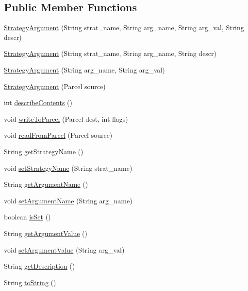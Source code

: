 \subsection*{Public Member Functions}
\begin{DoxyCompactItemize}
\item 
\hyperlink{classch_1_1zhaw_1_1ba10__bsha__1_1_1StrategyArgument_a66be298497fd2bf1afb35984d52360b8}{StrategyArgument} (String strat\_\-name, String arg\_\-name, String arg\_\-val, String descr)
\item 
\hyperlink{classch_1_1zhaw_1_1ba10__bsha__1_1_1StrategyArgument_a78121903280e3471780120ff923eb864}{StrategyArgument} (String strat\_\-name, String arg\_\-name, String descr)
\item 
\hyperlink{classch_1_1zhaw_1_1ba10__bsha__1_1_1StrategyArgument_a1fd5b2ee140e28571e04c21059377290}{StrategyArgument} (String arg\_\-name, String arg\_\-val)
\item 
\hyperlink{classch_1_1zhaw_1_1ba10__bsha__1_1_1StrategyArgument_a168a3cb11b9268aeeb2da1a0beca2e48}{StrategyArgument} (Parcel source)
\item 
int \hyperlink{classch_1_1zhaw_1_1ba10__bsha__1_1_1StrategyArgument_a9512363209aaf07138c49d9f5ad4e544}{describeContents} ()
\item 
void \hyperlink{classch_1_1zhaw_1_1ba10__bsha__1_1_1StrategyArgument_a08f54b2b1d26e5ac781f2fa04d7fbb2c}{writeToParcel} (Parcel dest, int flags)
\item 
void \hyperlink{classch_1_1zhaw_1_1ba10__bsha__1_1_1StrategyArgument_a5e5f2a91947c234f3e4eb17e34bdd9cd}{readFromParcel} (Parcel source)
\item 
String \hyperlink{classch_1_1zhaw_1_1ba10__bsha__1_1_1StrategyArgument_a20a6d523b6d1e1ba34f3d2de700aa6d2}{getStrategyName} ()
\item 
void \hyperlink{classch_1_1zhaw_1_1ba10__bsha__1_1_1StrategyArgument_a28088da3c6d84b84795ff51eac7585f6}{setStrategyName} (String strat\_\-name)
\item 
String \hyperlink{classch_1_1zhaw_1_1ba10__bsha__1_1_1StrategyArgument_a21d958fbf972ae5087f67783e0e39f1c}{getArgumentName} ()
\item 
void \hyperlink{classch_1_1zhaw_1_1ba10__bsha__1_1_1StrategyArgument_a465e881c78d8ed0156e340c2d0a31b70}{setArgumentName} (String arg\_\-name)
\item 
boolean \hyperlink{classch_1_1zhaw_1_1ba10__bsha__1_1_1StrategyArgument_acb69a3eb712c170e58895e7acc2ebed5}{isSet} ()
\item 
String \hyperlink{classch_1_1zhaw_1_1ba10__bsha__1_1_1StrategyArgument_a76a205f94be443d1afa031656caeea23}{getArgumentValue} ()
\item 
void \hyperlink{classch_1_1zhaw_1_1ba10__bsha__1_1_1StrategyArgument_aeab013b0a473256b0c7e3a8db8f3b6c1}{setArgumentValue} (String arg\_\-val)
\item 
String \hyperlink{classch_1_1zhaw_1_1ba10__bsha__1_1_1StrategyArgument_a4006c3123680c0506a6988ac46037c12}{getDescription} ()
\item 
String \hyperlink{classch_1_1zhaw_1_1ba10__bsha__1_1_1StrategyArgument_a7ce8d37f25b367e8c67d6579530b0d2f}{toString} ()
\end{DoxyCompactItemize}
